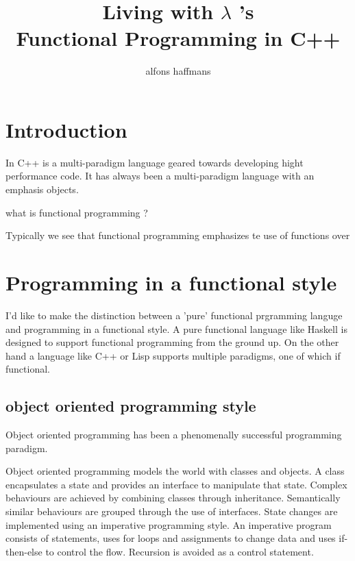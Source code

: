 \documentclass[12pt,fleqn]{article}
\begin{document}
\title{Living  with $\lambda$ 's \\ Functional Programming in C++}
\author {alfons haffmans}
\maketitle

\section* {Introduction}
In 
C++ is a multi-paradigm language geared towards developing hight performance code.
It has always been a multi-paradigm language with an emphasis objects.

what is functional programming ?

Typically we see that functional programming emphasizes te use of functions over 


\section*{Programming in a functional style}

I'd like to make the distinction between a 'pure' functional prgramming languge and programming in a functional style. 
A pure functional language like Haskell is designed to support functional programming from the ground up. 
On the other hand a language like C++ or Lisp supports multiple paradigms, one of which if functional.


\subsection*{object oriented programming style}
Object oriented programming has been a phenomenally successful programming paradigm.

Object oriented programming models the world with classes and objects.
A class encapsulates a state and provides an interface to manipulate that state.
Complex behaviours are achieved by combining classes through inheritance. 
Semantically similar behaviours are grouped through the use of interfaces. 
State changes are implemented using an imperative programming style.
An imperative program consists of statements, uses for loops  and assignments to change data and uses if-then-else to control the flow.
Recursion is avoided as a control statement.
\end{document}
